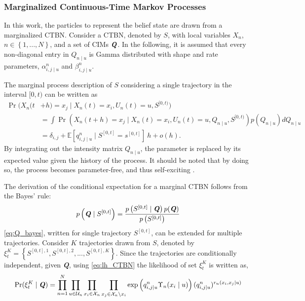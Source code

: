 \subsubsection{Marginalized Continuous-Time Markov Processes}
\label{sec:marg_ctbn}
In this work, the particles to represent the belief state are drawn from a marginalized CTBN. Consider a CTBN, denoted by $ S $, with local variables $ X_n $, $ n\in \left\lbrace 1,...,N \right\rbrace $, and a set of CIMs $ \textbf{\textit{Q}} $. In the following, it is assumed that every non-diagonal entry in $ Q_{n\mid u} $ is Gamma distributed with shape and rate parameters, $ \alpha^n_{i,j\mid u} $ and $ \beta^n_{i,j\mid u} $.\par
The marginal process description of $ S $ considering a single trajectory in the interval $ [0,t) $ can be written as
\begin{align}
\operatorname{Pr}(X_n(t &+ h) = x_j \mid X_n(t)=x_i, U_n(t)=u, S^{[0, t)})\\
&= \int \operatorname{Pr}(X_n(t + h) = x_j \mid X_n(t)=x_i, U_n(t)=u, Q_{n\mid u}, S^{[0, t)})p(Q_{n\mid u})dQ_{n\mid u}\\
&= \delta_{i,j} + \mathbb{E}[q^n_{i,j\mid u} \mid S^{[0, t]} = s^{[0, t]}]\ h + o(h).
\label{eq:marginal_CTBN}
\end{align}
By integrating out the intensity matrix $ Q_{n\mid u} $, the parameter is replaced by its expected value given the history of the process. It should be noted that by doing so, the process becomes parameter-free, and thus self-exciting \cite{Studer2016}. \par
The derivation of the conditional expectation for a marginal CTBN follows from the Bayes' rule:
\begin{equation}
p\left(\textbf{\textit{Q}} \mid S^{[0,t]}\right)=\frac{p\left(S^{[0,t]} \mid \textbf{\textit{Q}}\right) p(\textbf{\textit{Q}})}{p\left(S^{[0,t]}\right)}
\label{eq:Q_bayes}
\end{equation}
\autoref{eq:Q_bayes}, written for single trajectory $ S^{[0,t]} $, can be extended for multiple trajectories. Consider $ K $ trajectories drawn from $ S $, denoted by $ \xi^K_t = \left\lbrace S^{[0,t], 1}, S^{[0,t], 2}, ..., S^{[0,t], K} \right\rbrace  $. Since the trajectories are conditionally independent, given \textbf{\textit{Q}}, using \autoref{eq:lh_CTBN} the likelihood of set $ \xi^K_t $ is written as,
\begin{align}
\operatorname{Pr}( \xi^K_t  \mid \textbf{\textit{Q}} ) = \prod_{n=1}^{N} \prod_{u \in \mathcal{U}_{n}} \prod_{x_i \in \mathcal{X}_{n}} \prod_{x_j \in \mathcal{X}_{n} \backslash x_i}
\exp \left( q_{i,j\mid u}^{n} \Upsilon_{n}(x_i\mid u)\right) (q_{i,j\mid u}^{n})^{r_{n}(x_i, x_j\mid u)}
\label{eq:lh_dataset_CTBN}
\end{align}
